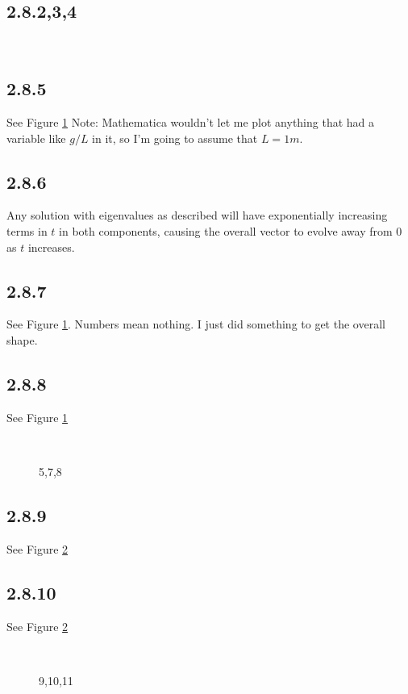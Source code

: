 \documentclass{article}
\begin{document}
\subsection*{2.8.2,3,4}
\begin{figure}[H]
\mbox{
      }
\end{figure}
\subsection*{2.8.5}
See Figure \ref{578}
Note: Mathematica wouldn't let me plot anything that had a variable like $g/L$ in it, so I'm going to assume that $L=1m$.

\subsection*{2.8.6}
Any solution with eigenvalues as described will have exponentially increasing terms in $t$ in both components, causing the overall vector to evolve away from $0$ as $t$ increases.
\subsection*{2.8.7}
See Figure \ref{578}. Numbers mean nothing. I just did something to get the overall shape.
\subsection*{2.8.8}
See Figure \ref{578}
\begin{figure}[H]
\mbox{
     }
\caption{5,7,8}
\label{578}
\end{figure}
\subsection*{2.8.9}
See Figure \ref{91011}
\subsection*{2.8.10}
See Figure \ref{91011}
\begin{figure}[H]
\mbox{
     }
\caption{9,10,11}
\label{91011}
\end{figure}
\end{document}
